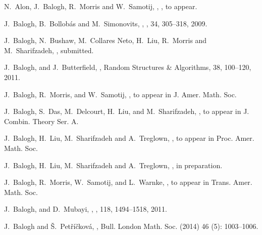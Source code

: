 \documentclass[12pt]{article}
\theoremstyle{definition}
\theoremstyle{definition}
\theoremstyle{definition}
\theoremstyle{definition}
\theoremstyle{definition}
\theoremstyle{definition}
\theoremstyle{definition}
\newcommand{\3}{\bf{3}}
\begin{document}
\begin{thebibliography}{99}
N.~Alon, J.~Balogh, R.~Morris and W.~Samotij,
,
, to appear.

 J.~Balogh, B.~Bollob\'as and M.~Simonovits, 
, 
, 34, 305--318, 2009.

J.~Balogh, N.~Bushaw, M.~Collares Neto, H.~Liu, R.~Morris and M.~Sharifzadeh,
, 
\newblock submitted.

  J.~Balogh, and J.~Butterfield, 
  , 
  \newblock Random Structures \& Algorithms, 38, 100--120, 2011.

 J.~Balogh, R.~Morris, and W.~Samotij, 
,  
\newblock to appear in J. Amer. Math. Soc.

J.~Balogh, S.~Das, M.~Delcourt, H.~Liu, and M.~Sharifzadeh,
, 
\newblock to appear in J. Combin. Theory Ser. A.

J.~Balogh, H.~Liu, M.~Sharifzadeh and A.~Treglown,
, 
\newblock to appear in Proc. Amer. Math. Soc.

J.~Balogh, H.~Liu, M.~Sharifzadeh and A.~Treglown,
, 
\newblock in preparation.

J.~Balogh, R.~Morris, W.~Samotij, and L.~Warnke, 
, 
\newblock to appear in Trans. Amer. Math. Soc.

J.~Balogh, and D.~Mubayi, 
,  
, 118, 1494--1518, 2011.


J.~Balogh and \v{S}.~Pet\v{r}\'{i}\v{c}kov\'{a}, , \newblock Bull. London Math. Soc. (2014) 46 (5): 1003--1006.



\end{thebibliography}
\end{document}
